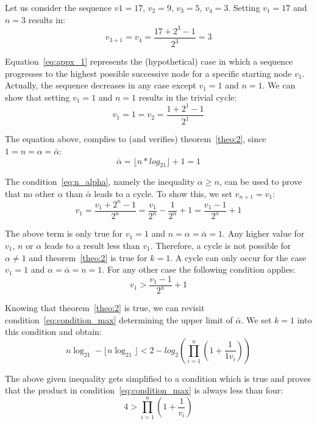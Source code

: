 \begin{example}
	Let us consider the sequence $v1=17$, $v_2=9$, $v_3=5$, $v_4=3$. Setting $v_1=17$ and $n=3$ results in:
	\[
	v_{3+1}=v_4=\frac{17+2^3-1}{2^3}=3
	\]
\end{example}

Equation~\ref{eq:appx_1} represents the (hypothetical) case in which a sequence progresses to the highest possible successive node for a specific starting node $v_1$. Actually, the sequence decreases in any case except $v_1=1$ and $n=1$. We can show that setting $v_1=1$ and $n=1$ results in the trivial cycle:
\[
v_1=1=v_2=\frac{1+2^1-1}{2^1}
\]

The equation above, complies to (and verifies) theorem~\ref{theo:2}, since $1=n=\alpha=\bar\alpha$:
\[
\bar\alpha=\lfloor n*log_21\rfloor+1=1
\]

The condition~\ref{eq:n_alpha}, namely the inequality $\alpha\ge n$, can be used to prove that no other $\alpha$ than $\bar\alpha$ leads to a cycle. To show this, we set $v_{n+1}=v_1$:
\[
v_1=\frac{v_1+2^n-1}{2^n}=\frac{v_1}{2^n}-\frac{1}{2^n}+1=\frac{v_1-1}{2^n}+1
\]

The above term is only true for $v_1=1$ and $n=\alpha=\bar\alpha=1$. Any higher value for $v_1$, $n$ or $\alpha$ leads to a result less than $v_1$. Therefore, a cycle is not possible for $\alpha\ne 1$ and theorem~\ref{theo:2} is true for $k=1$. A cycle can only occur for the case $v_1=1$ and $\alpha=\bar\alpha=n=1$. For any other case the following condition applies:
\[
v_1>\frac{v_1-1}{2^n}+1
\]

Knowing that theorem~\ref{theo:2} is true, we can revisit condition~\ref{eq:condition_max} determining the upper limit of $\bar\alpha$. We set $k=1$ into this condition and obtain:
\begin{equation}
n\log_21-\lfloor n\log_21\rfloor<2-log_2\left(\prod_{i=1}^{n}\left(1+\frac{1}{1v_{i}}\right)\right)
\end{equation}

The above given inequality gets simplified to a condition which is true and proves that the product in condition~\ref{eq:condition_max} is always less than four:
\[
4>\prod_{i=1}^{n}\left(1+\frac{1}{v_{i}}\right)
\]



